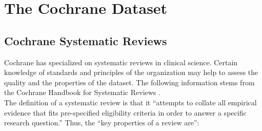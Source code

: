 \documentclass[11pt,a4paper,twoside]{book}\usepackage[]{graphicx}\usepackage[]{color}
\begin{document}
% 
% 
% 
% 
% 
% 













\chapter{The Cochrane Dataset} \label{ch:dataset}


\section{Cochrane Systematic Reviews}
Cochrane has specialized on systematic reviews in clinical science. Certain knowledge of standards and principles of the organization may help to assess the quality and the properties of the dataset. The following information stems from the Cochrane Handbook for Systematic Reviews \citep{cochrane.handbook}. \\
The definition of a systematic review is that it ``attempts to collate all empirical evidence that fits pre-specified eligibility criteria in order to answer a specific research question.'' Thus, the ``key properties of a review are'':
\end{document}
